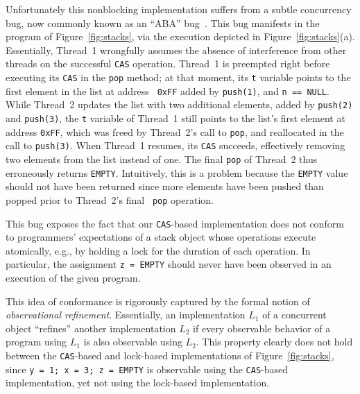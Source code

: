 Unfortunately this nonblocking implementation suffers from a subtle concurrency
bug, now commonly known as an ``ABA'' bug~\cite{tr/ibm/Michael04}. This bug
manifests in the program of Figure~\ref{fig:stacks}, via the 
execution depicted in Figure~\ref{fig:stacks}(a). 
Essentially, Thread~1 wrongfully assumes the absence of interference
from other threads on the successful {\tt CAS} operation. Thread~1 is preempted
right before executing its {\tt CAS} in the {\tt pop} method; at that moment,
its {\tt t} variable points to the first element in the list at address {\tt
0xFF} added by {\tt push(1)}, and {\tt n == NULL}. While Thread~2 updates the
list with two additional elements, added by {\tt push(2)} and {\tt push(3)},
the {\tt t} variable of Thread~1 still points to the list's first element at
address {\tt 0xFF}, which was freed by Thread~2's call to {\tt pop}, and
reallocated in the call to {\tt push(3)}. When Thread~1 resumes, its {\tt CAS}
succeeds, effectively removing two elements from the list instead of one. The
final {\tt pop} of Thread~2 thus erroneously returns {\tt EMPTY}. Intuitively,
this is a problem because the {\tt EMPTY} value should not have been returned
since more elements have been pushed than popped prior to Thread~2's final {\tt
pop} operation.

This bug exposes the fact that our {\tt CAS}-based implementation does not
conform to programmers' expectations of a stack object whose operations execute
atomically, e.g., by holding a lock for the duration of each operation.
In particular, the assignment {\tt z = EMPTY} should never have
been observed in an execution of the given program. 

This idea of conformance is rigorously captured by the formal notion of \emph{observational refinement}.
Essentially, an implementation $L_1$ of a concurrent object ``refines'' another
implementation $L_2$ if every observable behavior of a program using $L_1$ is
also observable using $L_2$. This property clearly does not hold between the
{\tt CAS}-based and lock-based implementations of Figure~\ref{fig:stacks},
since {\tt y = 1; x = 3; z = EMPTY} is observable using the {\tt CAS}-based
implementation, yet not using the lock-based implementation.
